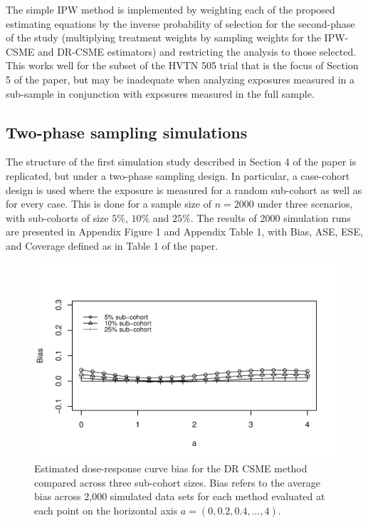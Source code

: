 \documentclass[12pt]{article}
\begin{document}
The simple IPW method is implemented by weighting each of the proposed estimating equations by the inverse probability of selection for the second-phase of the study (multiplying treatment weights by sampling weights for the IPW-CSME and DR-CSME estimators) and restricting the analysis to those selected. This works well for the subset of the HVTN 505 trial that is the focus of Section 5 of the paper, but may be inadequate when analyzing exposures measured in a sub-sample in conjunction with exposures measured in the full sample.

\subsection{Two-phase sampling simulations}

The structure of the first simulation study described in Section 4 of the paper is replicated, but under a two-phase sampling design. In particular, a case-cohort design is used where the exposure is measured for a random sub-cohort as well as for every case. This is done for a sample size of $n=2000$ under three scenarios, with sub-cohorts of size $5\%$, $10\%$ and $25\%$. The results of 2000 simulation runs are presented in Appendix Figure 1 and Appendix Table 1, with Bias, ASE, ESE, and Coverage defined as in Table 1 of the paper.

\begin{figure}
\centering
\includegraphics[width=6in]{app_fig1.pdf}
\caption{Estimated dose-response curve bias for the DR CSME method compared across three sub-cohort sizes. Bias refers to the average bias across 2,000 simulated data sets for each method evaluated at each point on the horizontal axis $a = (0, 0.2, 0.4, ..., 4)$.}
\end{figure}
\end{document}
